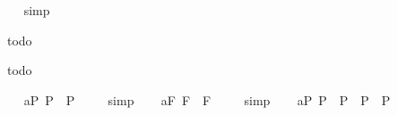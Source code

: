 \begin{isabellebody}
\isadelimproof
\ %
\endisadelimproof
%
\isatagproof
{}\isamarkupfalse%
\ simp\ \isamarkupfalse%
%
\endisatagproof
{\isafoldproof}%
%
\isadelimproof
%
\endisadelimproof
%
\isamarkuptrue%
%
\begin{isamarkuptext}%
todo%
\end{isamarkuptext}%
\isamarkuptrue%
%
\isamarkuptrue%
%
\begin{isamarkuptext}%
todo%
\end{isamarkuptext}%
\isamarkuptrue%
%
\isamarkuptrue%
\ \isamarkupfalse%
\ a{}{}{\isacharunderscore}{}{\isacharunderscore}P{\isacharcolon}\ {\isachardoublequoteopen}{\isacharbrackleft}\isactrlbold {\isasymA}{\isacharparenleft}\isactrlbold {\isasymnot}{\isasymphi}\isactrlsup P{\isacharparenright}\ \isactrlbold {\isasymequiv}\ \isactrlbold {\isasymnot}\isactrlbold {\isasymA}{\isacharparenleft}{\isasymphi}\isactrlsup P{\isacharparenright}{\isacharbrackright}\ {\isacharequal}\ {\isasymtop}{\isachardoublequoteclose}%
\isadelimproof
\ %
\endisadelimproof
%
\isatagproof
{}\isamarkupfalse%
\ simp\ \isamarkupfalse%
%
\endisatagproof
{\isafoldproof}%
%
\isadelimproof
%
\endisadelimproof
\isanewline
\ \isamarkupfalse%
\ a{}{}{\isacharunderscore}{}{\isacharunderscore}F{\isacharcolon}\ {\isachardoublequoteopen}{\isacharbrackleft}\isactrlbold {\isasymA}{\isacharparenleft}\isactrlbold {\isasymnot}{\isasymphi}\isactrlsup F{\isacharparenright}\ \isactrlbold {\isasymequiv}\ \isactrlbold {\isasymnot}\isactrlbold {\isasymA}{\isacharparenleft}{\isasymphi}\isactrlsup F{\isacharparenright}{\isacharbrackright}\ {\isacharequal}\ {\isasymtop}{\isachardoublequoteclose}%
\isadelimproof
\ %
\endisadelimproof
%
\isatagproof
{}\isamarkupfalse%
\ simp\ \isamarkupfalse%
%
\endisatagproof
{\isafoldproof}%
%
\isadelimproof
%
\endisadelimproof
\isanewline
\ \isamarkupfalse%
\ a{}{}{\isacharunderscore}{}{\isacharunderscore}P{\isacharcolon}\ {\isachardoublequoteopen}{\isacharbrackleft}\isactrlbold {\isasymA}{\isacharparenleft}{\isasymphi}\isactrlsup P\ \isactrlbold {\isasymrightarrow}\ {\isasympsi}\isactrlsup P{\isacharparenright}\ \isactrlbold {\isasymequiv}\ {\isacharparenleft}\isactrlbold {\isasymA}{\isacharparenleft}{\isasymphi}\isactrlsup P{\isacharparenright}\ \isactrlbold {\isasymrightarrow}\ \isactrlbold {\isasymA}{\isacharparenleft}{\isasympsi}\isactrlsup P{\isacharparenright}{\isacharparenright}{\isacharbrackright}\ {\isacharequal}\ {\isasymtop}{\isachardoublequoteclose}%

\end{isabellebody}
